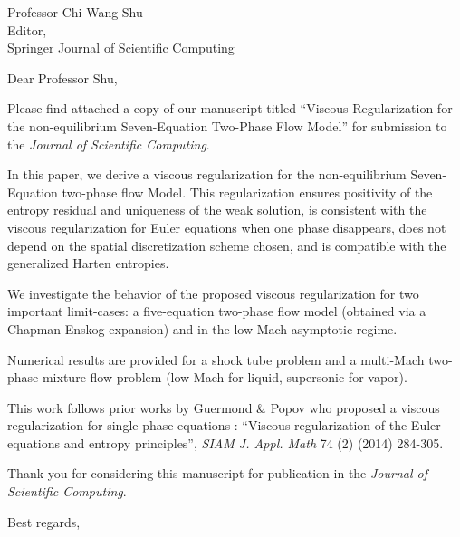 \begin{letter}{Professor Chi-Wang Shu\\
    Editor,\\
    Springer Journal of Scientific Computing}
\date{\today}

\opening{Dear Professor Shu,}
         \vspace{0.25cm}

Please find attached a copy of our manuscript titled ``Viscous Regularization for the non-equilibrium Seven-Equation Two-Phase Flow Model'' for submission to the {\em Journal of Scientific Computing}. 

In this paper, we derive a viscous regularization for the non-equilibrium Seven-Equation two-phase flow Model. This regularization ensures positivity of the entropy 
residual and uniqueness of the weak solution, is consistent with the viscous regularization for Euler equations when one phase disappears, does not depend on the spatial discretization scheme chosen, and is compatible with the generalized Harten entropies. 

We investigate the behavior of the proposed viscous regularization for two important limit-cases: a five-equation two-phase flow model (obtained via a Chapman-Enskog expansion) and in the low-Mach asymptotic regime.


Numerical results are provided for a shock tube problem and a multi-Mach two-phase mixture flow problem (low Mach for liquid, supersonic for vapor).


This work follows prior works by Guermond \& Popov who proposed a viscous regularization for single-phase equations : ``Viscous regularization of the Euler equations and entropy principles'', {\it SIAM J. Appl. Math} 74 (2) (2014) 284-305.


Thank you for considering this manuscript for publication in the {\it Journal of Scientific Computing}.

\vspace{0.25cm}



\closing{Best regards, }

\end{letter}


